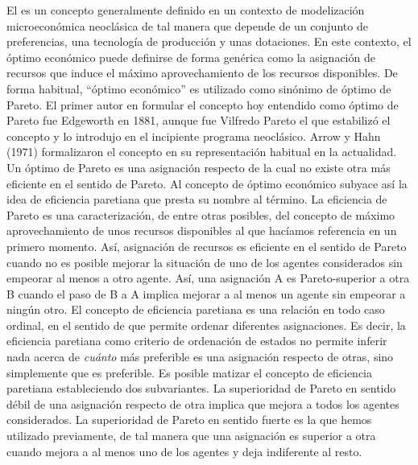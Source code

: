 \documentclass{nuevotema}
\begin{document}
El  es un concepto generalmente definido en un contexto de modelización microeconómica neoclásica de tal manera que depende de un conjunto de preferencias, una tecnología de producción y unas dotaciones. En este contexto, el óptimo económico puede definirse de forma genérica como la asignación de recursos que induce el máximo aprovechamiento de los recursos disponibles. De forma habitual, ``óptimo económico'' es utilizado como sinónimo de óptimo de Pareto.  El primer autor en formular el concepto hoy entendido como óptimo de Pareto fue Edgeworth en 1881, aunque fue Vilfredo Pareto el que estabilizó el concepto y lo introdujo en el incipiente programa neoclásico. Arrow y Hahn (1971) formalizaron el concepto en su representación habitual en la actualidad. Un óptimo de Pareto es una asignación respecto de la cual no existe otra más eficiente en el sentido de Pareto. Al concepto de óptimo económico subyace así la idea de eficiencia paretiana que presta su nombre al término. La eficiencia de Pareto es una caracterización, de entre otras posibles, del concepto de máximo aprovechamiento de unos recursos disponibles al que hacíamos referencia en un primero momento. Así, asignación de recursos es eficiente en el sentido de Pareto cuando no es posible mejorar la situación de uno de los agentes considerados sin empeorar al menos a otro agente. Así, una asignación A es Pareto-superior a otra B cuando el paso de B a A implica mejorar a al menos un agente sin empeorar a ningún otro. El concepto de eficiencia paretiana es una relación en todo caso ordinal, en el sentido de que permite ordenar diferentes asignaciones. Es decir, la eficiencia paretiana como criterio de ordenación de estados no permite inferir nada acerca de \textit{cuánto} más preferible es una asignación respecto de otras, sino simplemente que es preferible. Es posible matizar el concepto de eficiencia paretiana estableciendo dos subvariantes. La superioridad de Pareto en sentido débil de una asignación respecto de otra implica que mejora a todos los agentes considerados. La superioridad de Pareto en sentido fuerte es la que hemos utilizado previamente, de tal manera que una asignación es superior a otra cuando mejora a al menos uno de los agentes y deja indiferente al resto.
\end{document}
